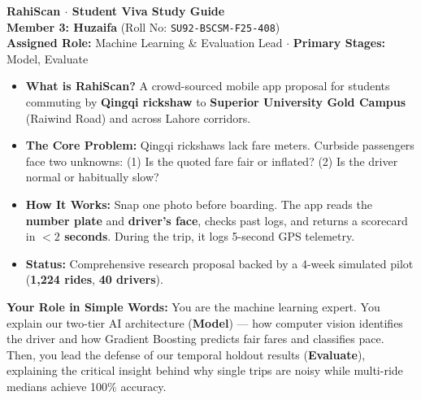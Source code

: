 \documentclass[10pt, a4paper]{article}
\begin{document}
\begin{tcolorbox}[enhanced, colback=navyblue, colframe=navyblue, arc=3pt, left=8pt, right=8pt, top=4pt, bottom=4pt]
  {\fontsize{15pt}{17pt}\selectfont\color{white}\bfseries RahiScan \(\cdot\) Student Viva Study Guide}\\[1.5pt]
  {\fontsize{10pt}{12pt}\selectfont\color{softteal}\textbf{Member 3: Huzaifa} (Roll No: \texttt{SU92-BSCSM-F25-408})}\\[1pt]
  {\fontsize{8.5pt}{10.5pt}\selectfont\color{white!85!softblue}\textbf{Assigned Role:} Machine Learning \& Evaluation Lead \(\cdot\) \textbf{Primary Stages:} Model, Evaluate}
\end{tcolorbox}

\begin{overviewbox}
\footnotesize
\begin{itemize}\setlength{\itemsep}{0.8pt}\setlength{\parskip}{0pt}
  \item \textbf{What is RahiScan?} A crowd-sourced mobile app proposal for students commuting by \textbf{Qingqi rickshaw} to \textbf{Superior University Gold Campus} (Raiwind Road) and across Lahore corridors.
  \item \textbf{The Core Problem:} Qingqi rickshaws lack fare meters. Curbside passengers face two unknowns: (1) Is the quoted fare fair or inflated? (2) Is the driver normal or habitually slow?
  \item \textbf{How It Works:} Snap one photo before boarding. The app reads the \textbf{number plate} and \textbf{driver's face}, checks past logs, and returns a scorecard in \textbf{\(< 2\) seconds}. During the trip, it logs 5-second GPS telemetry.
  \item \textbf{Status:} Comprehensive research proposal backed by a 4-week simulated pilot (\textbf{1,224 rides}, \textbf{40 drivers}).
\end{itemize}
\end{overviewbox}

\begin{tcolorbox}[enhanced, colback=white, colframe=bordergray, boxrule=0.4pt, arc=2.5pt, left=6pt, right=6pt, top=2.5pt, bottom=2.5pt]
  \footnotesize \textbf{Your Role in Simple Words:} You are the machine learning expert. You explain our two-tier AI architecture (\textbf{Model}) --- how computer vision identifies the driver and how Gradient Boosting predicts fair fares and classifies pace. Then, you lead the defense of our temporal holdout results (\textbf{Evaluate}), explaining the critical insight behind why single trips are noisy while multi-ride medians achieve 100\% accuracy.
\end{tcolorbox}
\end{document}
